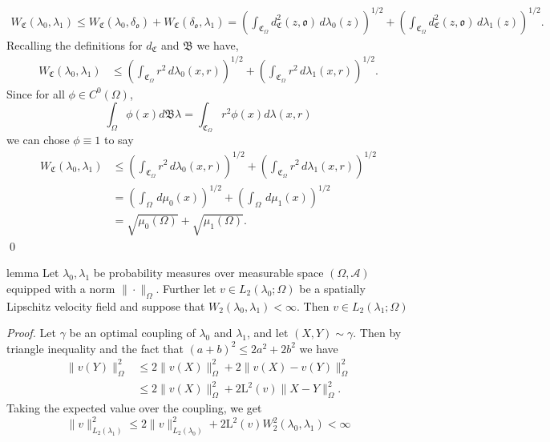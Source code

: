 \documentclass[11pt]{article}
\begin{document}
\begin{align*}
    W_\mathfrak{C}(\lambda_0, \lambda_1) \leq W_\mathfrak{C}(\lambda_0, \delta_\mathfrak{o}) + W_\mathfrak{C}(\delta_\mathfrak{o}, \lambda_1) = \left(\int_{\mathfrak{C}_\Omega}d_\mathfrak{C}^2(z, \mathfrak{o}) \, d\lambda_0(z)\right)^{1/2} + \left(\int_{\mathfrak{C}_\Omega}d^2_\mathfrak{C}(z, \mathfrak{o}) \, d\lambda_1(z)\right)^{1/2}.
\end{align*}
Recalling the definitions for $d_\mathfrak{C}$ and $\mathfrak{B}$ we have,
\begin{align*}
     W_\mathfrak{C}(\lambda_0, \lambda_1) &\leq \left(\int_{\mathfrak{C}_\Omega}r^2 \, d\lambda_0(x,r)\right)^{1/2} + \left(\int_{\mathfrak{C}_\Omega}r^2 \, d\lambda_1(x,r)\right)^{1/2}. 
\end{align*}
Since for all $\phi \in C^0(\Omega)$, 
\[\int_\Omega \phi(x)d\mathfrak{B}\lambda = \int_{\mathfrak{C}_\Omega}r^2\phi(x)d\lambda(x,r)\]
we can chose $\phi \equiv 1$ to say
\begin{align*}
     W_\mathfrak{C}(\lambda_0, \lambda_1) &\leq \left(\int_{\mathfrak{C}_\Omega}r^2 \, d\lambda_0(x,r)\right)^{1/2} + \left(\int_{\mathfrak{C}_\Omega}r^2 \, d\lambda_1(x,r)\right)^{1/2} \\
     &= \left(\int_{\Omega} \, d\mu_0(x)\right)^{1/2} + \left(\int_{\Omega} \, d\mu_1(x)\right)^{1/2} \\
     &= \sqrt{\mu_0(\Omega)} + \sqrt{\mu_1(\Omega)}.
\end{align*}
\qed{}
\\
\begin{restatable}{lemma}{} \label{L2}
    Let $\lambda_0, \lambda_1$ be probability measures over measurable space $(\Omega, \mathcal{A})$ equipped with a norm $\|\cdot \|_\Omega$. Further let $v \in L_2(\lambda_0; \Omega)$ be a spatially Lipschitz velocity field and suppose that $W_2(\lambda_0, \lambda_1) < \infty$. Then $v \in L_2(\lambda_1; \Omega)$
\end{restatable}
\noindent \textit{Proof.} Let $\gamma$ be an optimal coupling of $\lambda_0$ and $\lambda_1$, and let $(X,Y) \sim \gamma$. Then by triangle inequality and the fact that $(a + b)^2 \leq 2a^2 + 2b^2$ we have
\begin{align*}
    \|v(Y)\|_\Omega^2  &\leq 2\|v(X)\|_\Omega^2 + 2\|v(X) - v(Y)\|_\Omega^2 \\
    &\leq 2\|v(X)\|_\Omega^2 + 2\text{L}^2(v)\|X - Y\|_\Omega^2.
\end{align*}
Taking the expected value over the coupling, we get
\[\|v\|_{L_2(\lambda_1)}^2 \leq 2\|v\|_{L_2(\lambda_0)}^2 + 2\text{L}^2(v)W^2_2(\lambda_0, \lambda_1) < \infty\]
\end{document}
